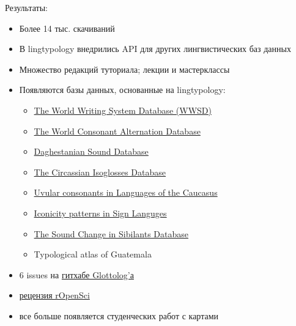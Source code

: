 \documentclass[13pt, t]{beamer}
\begin{document}
\begin{frame}{Результаты:}
\begin{itemize}
\item Более 14 тыс. скачиваний \pause
\item В lingtypology внедрились API для других лингвистических баз данных\pause
\item Множество редакций туториала; лекции и мастерклассы\pause
\item Появляются базы данных, основанные на lingtypology:
\begin{itemize}
\item \href{https://agricolamz.github.io/wwsd/}{The World Writing System Database  (WWSD)}
\item \href{https://agricolamz.github.io/wcad/}{The World Consonant Alternation Database}
\item \href{https://daghestanian-sound-database.herokuapp.com/}{Daghestanian Sound Database}
\item \href{https://agricolamz.github.io/The_Circassian_Isoglosses_Database/}{The Circassian Isoglosses Database}
\item \href{https://agricolamz.github.io/uvular_database/}{Uvular consonants in Languages of the Caucasus}
\item \href{https://sl-iconicity.shinyapps.io/iconicity_patterns/}{Iconicity patterns in Sign Languges}
\item \href{https://agricolamz.github.io/scsd/}{The Sound Change in Sibilants Database}
\item Typological atlas of Guatemala \pause
\end{itemize}
\item 6 issues на \href{https://github.com/clld/glottolog}{гитхабе Glottolog'а} \pause
\item \href{https://github.com/ropensci/software-review/issues/95}{рецензия rOpenSci} \pause
\item все больше появляется студенческих работ с картами
\end{itemize}
\end{frame}

\end{document}
